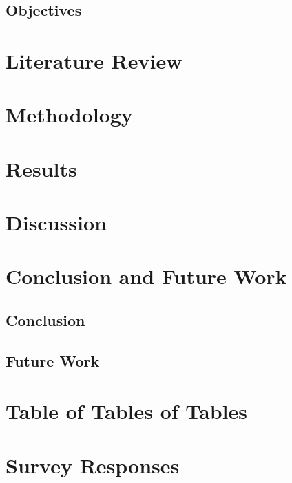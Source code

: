 \documentclass{abertayhons}
\begin{document}
\Blindtext[1]

\section{Objectives}

\blinditemize

\chapter{Literature Review}

\Blindtext

\chapter{Methodology}

\blindmathpaper

\chapter{Results}

\Blindtext

\chapter{Discussion}

\Blindtext

\chapter{Conclusion and Future Work}

\section{Conclusion}

\Blindtext

\section{Future Work}

\Blindtext

\appendix

\chapter{Table of Tables of Tables}

\Blindtext[2]

\chapter{Survey Responses}

\Blindtext[7]

\printbibliography
\end{document}
